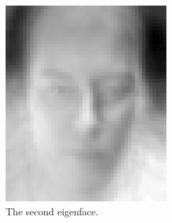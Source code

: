 \documentclass[a4paper, 10pt, conference]{ieeeconf}
\begin{document}
\begin{figure}[ht]
\begin{subfigure}{0.2\textwidth}
          \includegraphics[width=\textwidth]{src/eigface5.png}
          \caption{The second eigenface.}
                \label{fig:eigface5}
        \end{subfigure}
        \\
        \begin{subfigure}{0.2\textwidth}

\end{subfigure}
\end{figure}
\end{document}
